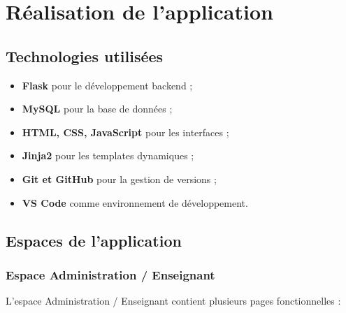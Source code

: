 \documentclass[a4paper,12pt,oneside]{report}
\begin{document}
\chapter{Réalisation de l'application}

\section{Technologies utilisées}

\begin{itemize}
    \item \textbf{Flask} pour le développement backend ;
    \item \textbf{MySQL} pour la base de données ;
    \item \textbf{HTML, CSS, JavaScript} pour les interfaces ;
    \item \textbf{Jinja2} pour les templates dynamiques ;
    \item \textbf{Git et GitHub} pour la gestion de versions ;
    \item \textbf{VS Code} comme environnement de développement.
\end{itemize}

\section{Espaces de l'application}

\subsection{Espace Administration / Enseignant}

L'espace Administration / Enseignant contient plusieurs pages fonctionnelles :
\end{document}
